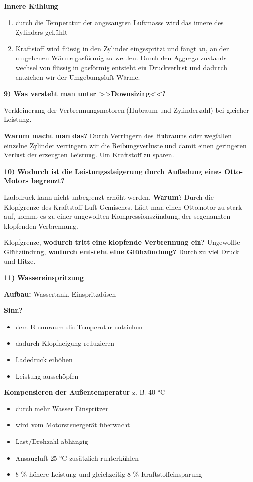 \textbf{Innere Kühlung}

\begin{enumerate}
\item
  durch die Temperatur der angesaugten Luftmasse wird das innere des
  Zylinders gekühlt
\item
  Kraftstoff wird flüssig in den Zylinder eingespritzt und fängt an, an
  der umgebenen Wärme gasförmig zu werden. Durch den Aggregatzustands
  wechsel von flüssig in gasförmig entsteht ein Druckverlust und dadurch
  entziehen wir der Umgebungsluft Wärme.
\end{enumerate}

\textbf{9) Was versteht man unter >>Downsizing<<?}

Verkleinerung der Verbrennungsmotoren (Hubraum und Zylinderzahl) bei
gleicher Leistung.

\textbf{Warum macht man das?} Durch Verringern des Hubraums oder
wegfallen einzelne Zylinder verringern wir die Reibungsverluste und
damit einen geringeren Verlust der erzeugten Leistung. Um Kraftstoff zu
sparen.

\textbf{10) Wodurch ist die Leistungssteigerung durch Aufladung eines
Otto-Motors begrenzt?}

Ladedruck kann nicht unbegrenzt erhöht werden. \textbf{Warum?} Durch die
Klopfgrenze des Kraftstoff-Luft-Gemisches. Lädt man einen Ottomotor zu
stark auf, kommt es zu einer ungewollten Kompressionszündung, der
sogenannten klopfenden Verbrennung.

Klopfgrenze, \textbf{wodurch tritt eine klopfende Verbrennung ein?}
Ungewollte Glühzündung, \textbf{wodurch entsteht eine Glühzündung?}
Durch zu viel Druck und Hitze.

\textbf{11) Wassereinspritzung}

\textbf{Aufbau:} Wassertank, Einspritzdüsen

\textbf{Sinn?}

\begin{itemize}
\item
  dem Brennraum die Temperatur entziehen
\item
  dadurch Klopfneigung reduzieren
\item
  Ladedruck erhöhen
\item
  Leistung ausschöpfen
\end{itemize}

\textbf{Kompensieren der Außentemperatur} z. B. 40 °C

\begin{itemize}
\item
  durch mehr Wasser Einspritzen
\item
  wird vom Motorsteuergerät überwacht
\item
  Last/Drehzahl abhängig
\item
  Ansaugluft 25 °C zusätzlich runterkühlen
\item
  8 \% höhere Leistung und gleichzeitig 8 \% Kraftstoffeinsparung
\end{itemize}

